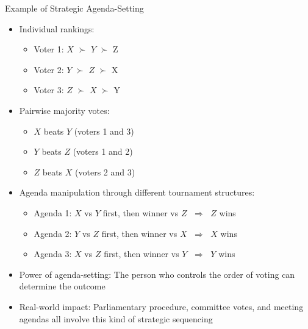 \documentclass[10pt,handout]{beamer}
\newcommand{\ie}{\;\Longrightarrow\;}
\begin{document}
\begin{frame}{Example of Strategic Agenda-Setting}
  \begin{itemize}[<+->]
    \item Individual rankings:
      \begin{itemize}
        \item Voter 1: $X$ $\succ$ $Y$ $\succ$ Z
        \item Voter 2: $Y$ $\succ$ $Z$ $\succ$ X
        \item Voter 3: $Z$ $\succ$ $X$ $\succ$ Y
      \end{itemize}
    \item Pairwise majority votes:
      \begin{itemize}
        \item $X$ beats $Y$ (voters 1 and 3)
        \item $Y$ beats $Z$ (voters 1 and 2)
        \item $Z$ beats $X$ (voters 2 and 3)
      \end{itemize}
    \item Agenda manipulation through different tournament structures:
      \begin{itemize}
        \item Agenda 1: $X$ vs $Y$ first, then winner vs $Z$ $\ie$ $Z$ wins
        \item Agenda 2: $Y$ vs $Z$ first, then winner vs $X$ $\ie$ $X$ wins
        \item Agenda 3: $X$ vs $Z$ first, then winner vs $Y$ $\ie$ $Y$ wins
      \end{itemize}
    \item Power of agenda-setting: The person who controls the order of voting can determine the outcome
    \item Real-world impact: Parliamentary procedure, committee votes, and meeting agendas all involve this kind of strategic sequencing
  \end{itemize}
\end{frame}
\end{document}
